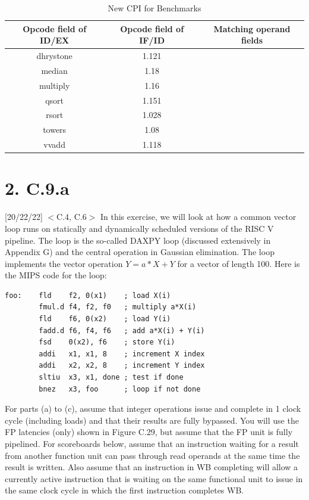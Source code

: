 \documentclass[11pt]{article}
\begin{document}
\begin{table}[ht]
\caption{New CPI for Benchmarks} %
\centering %
\begin{tabular}{c c c} %
\hline\hline %
Opcode field of ID/EX & Opcode field of IF/ID & Matching operand fields \\ [0.5ex] %
\hline %
dhrystone & 1.121 \\
median & 1.18 \\
multiply & 1.16 \\
qsort & 1.151 \\
rsort & 1.028 \\
towers & 1.08 \\
vvadd & 1.118 \\
[1ex] %
\hline %
\end{tabular}
\label{table:nonlin} %
\end{table}

\newpage
\section*{2. C.9.a}

[20/22/22] $<$C.4, C.6$>$ In this exercise, we will look at how a common vector loop runs on statically and dynamically scheduled versions of the RISC V pipeline. The loop is the so-called DAXPY loop (discussed extensively in Appendix G) and the central operation in Gaussian elimination. The loop implements the vector operation $Y=a*X+Y$ for a vector of length 100. Here is the MIPS code for the loop:

\begin{verbatim}
foo:    fld    f2, 0(x1)    ; load X(i)
        fmul.d f4, f2, f0   ; multiply a*X(i)
        fld    f6, 0(x2)    ; load Y(i)
        fadd.d f6, f4, f6   ; add a*X(i) + Y(i)
        fsd    0(x2), f6    ; store Y(i)
        addi   x1, x1, 8    ; increment X index
        addi   x2, x2, 8    ; increment Y index
        sltiu  x3, x1, done ; test if done
        bnez   x3, foo      ; loop if not done
\end{verbatim}

For parts (a) to (c), assume that integer operations issue and complete in 1 clock cycle (including loads) and that their results are fully bypassed. You will use the FP latencies (only) shown in Figure C.29, but assume that the FP unit is fully pipelined. For scoreboards below, assume that an instruction waiting for a result from another function unit can pass through read operands at the same time the result is written. Also assume that an instruction in WB completing will allow a currently active instruction that is waiting on the same functional unit to issue in the same clock cycle in which the first instruction completes WB.
\end{document}
